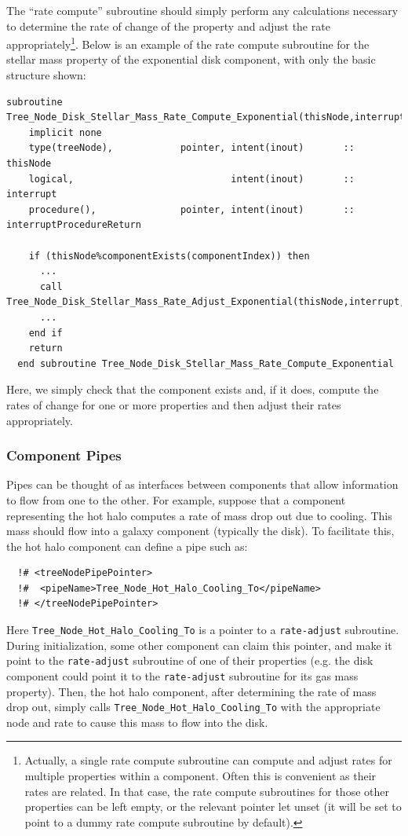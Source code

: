 The ``rate compute'' subroutine should simply perform any calculations necessary to determine the rate of change of the property and adjust the rate appropriately\footnote{Actually, a single rate compute subroutine can compute and adjust rates for multiple properties within a component. Often this is convenient as their rates are related. In that case, the rate compute subroutines for those other properties can be left empty, or the relevant pointer let unset (it will be set to point to a dummy rate compute subroutine by default).}. Below is an example of the rate compute subroutine for the stellar mass property of the exponential disk component, with only the basic structure shown:
\begin{lstlisting}[escapechar=@,breaklines,prebreak=\&,postbreak=\&]
  subroutine Tree_Node_Disk_Stellar_Mass_Rate_Compute_Exponential(thisNode,interrupt,interruptProcedureReturn)
    implicit none
    type(treeNode),            pointer, intent(inout)       :: thisNode
    logical,                            intent(inout)       :: interrupt
    procedure(),               pointer, intent(inout)       :: interruptProcedureReturn
 
    if (thisNode%componentExists(componentIndex)) then
      ...
      call Tree_Node_Disk_Stellar_Mass_Rate_Adjust_Exponential(thisNode,interrupt,interruptProcedure,stellarMassRate)
      ...
    end if
    return
  end subroutine Tree_Node_Disk_Stellar_Mass_Rate_Compute_Exponential
\end{lstlisting}
Here, we simply check that the component exists and, if it does, compute the rates of change for one or more properties and then adjust their rates appropriately.

\subsubsection{Component Pipes}

Pipes can be thought of as interfaces between components that allow information to flow from one to the other. For example, suppose that a component representing the hot halo computes a rate of mass drop out due to cooling. This mass should flow into a galaxy component (typically the disk). To facilitate this, the hot halo component can define a pipe such as:
\begin{verbatim}
  !# <treeNodePipePointer>
  !#  <pipeName>Tree_Node_Hot_Halo_Cooling_To</pipeName>
  !# </treeNodePipePointer>
\end{verbatim}
Here {\tt Tree\_Node\_Hot\_Halo\_Cooling\_To} is a pointer to a {\tt rate-adjust} subroutine. During initialization, some other component can claim this pointer, and make it point to the {\tt rate-adjust} subroutine of one of their properties (e.g. the disk component could point it to the {\tt rate-adjust} subroutine for its gas mass property). Then, the hot halo component, after determining the rate of mass drop out, simply calls {\tt Tree\_Node\_Hot\_Halo\_Cooling\_To} with the appropriate node and rate to cause this mass to flow into the disk. 


